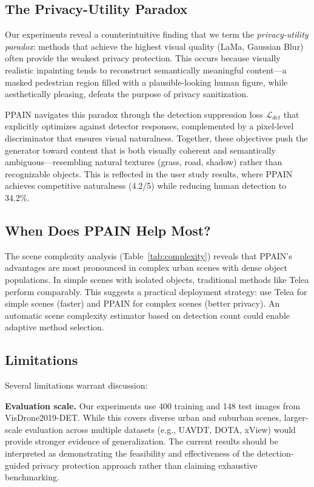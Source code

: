 \documentclass[preprint,12pt]{elsarticle}
\begin{document}
\subsection{The Privacy-Utility Paradox}

Our experiments reveal a counterintuitive finding that we term the \emph{privacy-utility paradox}: methods that achieve the highest visual quality (LaMa, Gaussian Blur) often provide the weakest privacy protection. This occurs because visually realistic inpainting tends to reconstruct semantically meaningful content---a masked pedestrian region filled with a plausible-looking human figure, while aesthetically pleasing, defeats the purpose of privacy sanitization.

PPAIN navigates this paradox through the detection suppression loss $\mathcal{L}_{det}$ that explicitly optimizes against detector responses, complemented by a pixel-level discriminator that ensures visual naturalness. Together, these objectives push the generator toward content that is both visually coherent and semantically ambiguous---resembling natural textures (grass, road, shadow) rather than recognizable objects. This is reflected in the user study results, where PPAIN achieves competitive naturalness (4.2/5) while reducing human detection to 34.2\%.

\subsection{When Does PPAIN Help Most?}

The scene complexity analysis (Table~\ref{tab:complexity}) reveals that PPAIN's advantages are most pronounced in complex urban scenes with dense object populations. In simple scenes with isolated objects, traditional methods like Telea perform comparably. This suggests a practical deployment strategy: use Telea for simple scenes (faster) and PPAIN for complex scenes (better privacy). An automatic scene complexity estimator based on detection count could enable adaptive method selection.

\subsection{Limitations}

Several limitations warrant discussion:

\textbf{Evaluation scale.} Our experiments use 400 training and 148 test images from VisDrone2019-DET. While this covers diverse urban and suburban scenes, larger-scale evaluation across multiple datasets (e.g., UAVDT, DOTA, xView) would provide stronger evidence of generalization. The current results should be interpreted as demonstrating the feasibility and effectiveness of the detection-guided privacy protection approach rather than claiming exhaustive benchmarking.
\end{document}
